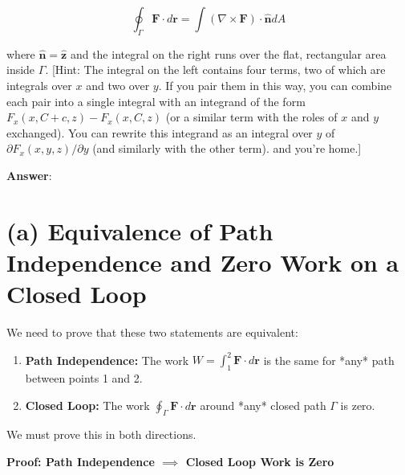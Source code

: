 \documentclass[11pt, a4paper]{article} %
\begin{document}
\begin{equation*}
    \oint_\Gamma \mathbf{F} \cdot d\mathbf{r} = \int (\nabla \times \mathbf{F}) \cdot \hat{\mathbf{n}} d A
\end{equation*}

where $\hat{\mathbf{n}} = \hat{\mathbf{z}}$ and the integral on the right runs over the flat, rectangular area inside $\Gamma$. [Hint: The integral on the left contains four terms, two of which are integrals over $x$ and two over $y$. If you pair them in this way, you can combine each pair into a single integral with an integrand of the form $F_x (x, C+c, z) - F_x(x, C, z)$ (or a similar term with the roles of $x$ and $y$ exchanged). You can rewrite this integrand as an integral over $y$ of $\partial F_x(x,y,z)/ \partial y$ (and similarly with the other term). and you're home.]

\textbf{Answer}:

\section*{(a) Equivalence of Path Independence and Zero Work on a Closed Loop}

We need to prove that these two statements are equivalent:
\begin{enumerate}
    \item \textbf{Path Independence:} The work $W = \int_1^2 \mathbf{F} \cdot d \mathbf{r}$ is the same for *any* path between points 1 and 2.
    \item \textbf{Closed Loop:} The work $\oint_\Gamma \mathbf{F} \cdot d \mathbf{r}$ around *any* closed path $\Gamma$ is zero.
\end{enumerate}

We must prove this in both directions.

\textbf{Proof: Path Independence $\implies$ Closed Loop Work is Zero}
\end{document}
